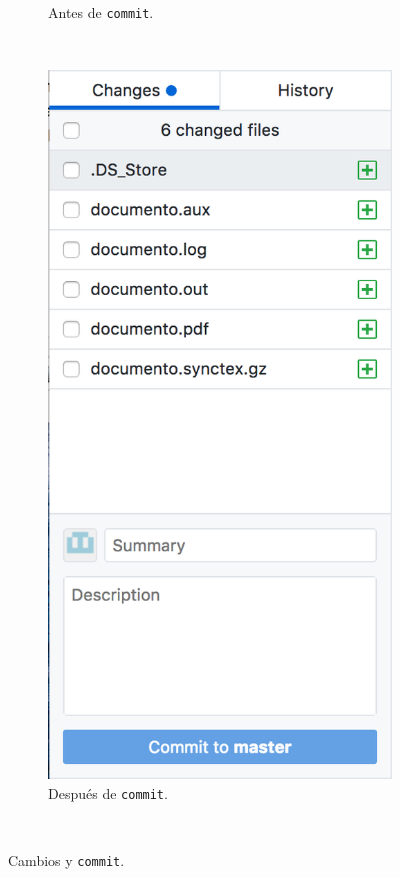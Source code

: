 \documentclass[10pt]{article}
\begin{document}
\begin{figure}[!h]
\begin{subfigure}[b]{0.3\textwidth}
        \caption{Antes de \texttt{commit}.}
        \label{cambios1}
    \end{subfigure}
    ~ %
    \begin{subfigure}[b]{0.3\textwidth}
        \includegraphics[width=\textwidth]{Figuras/cambios2.png}
        \caption{Después de \texttt{commit}.}
        \label{cambios2}
    \end{subfigure}
    ~ %
    \caption{Cambios y \texttt{commit}.}\label{cambios}
\end{figure}
\end{document}
